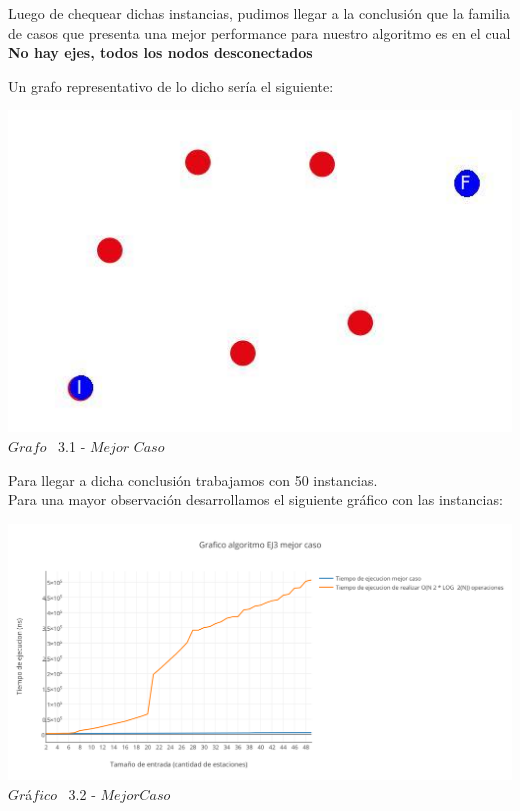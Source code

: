 Luego de chequear dichas instancias, pudimos llegar a la conclusi\'on que la familia de casos que presenta una mejor performance para nuestro algoritmo
es en el cual \textbf{No hay ejes, todos los nodos desconectados}

Un grafo representativo de lo dicho ser\'ia el siguiente:

\vspace*{0.3cm} \vspace*{0.3cm}
  \begin{center}
\includegraphics[scale=0.5]{./EJ3/grafoSinEjes.jpeg}
\\{$Grafo$ \ 3.1 - $Mejor$ $Caso$} 
  \end{center}
  \vspace*{0.3cm}
  
Para llegar a dicha conclusi\'on trabajamos con 50 instancias.\\

Para una mayor observaci\'on desarrollamos el siguiente gr\'afico con las instancias:\\

\vspace*{0.3cm} \vspace*{0.3cm}
  \begin{center}
 \includegraphics[scale=0.65]{./EJ3/mejorcaso.png}
 {$Gr$\'a$fico$ \ 3.2 - $Mejor Caso$}
  \end{center}
  \vspace*{0.3cm}
  
